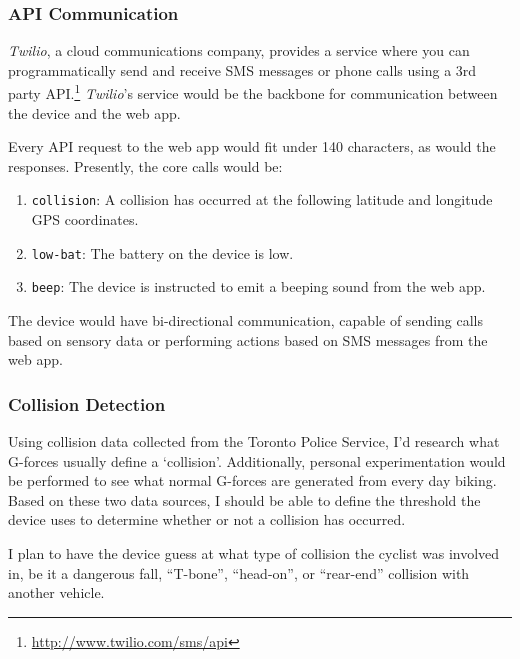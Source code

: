 \documentclass[titlepage]{article}
\begin{document}
\subsubsection{API Communication}
{\em Twilio}, a cloud communications company, provides a service where you can programmatically send and receive SMS messages or phone calls using a 3rd party API.\footnote{\url{http://www.twilio.com/sms/api}} {\em Twilio}'s service would be the backbone for communication between the device and the web app.

Every API request to the web app would fit under 140 characters, as would the responses. Presently, the core calls would be:

\begin{enumerate}
	\item {\tt collision}: A collision has occurred at the following latitude and longitude GPS coordinates.
	\item {\tt low-bat}: The battery on the device is low.
	\item {\tt beep}: The device is instructed to emit a beeping sound from the web app.
\end{enumerate}

The device would have bi-directional communication, capable of sending calls based on sensory data or performing actions based on SMS messages from the web app.

\subsubsection{Collision Detection}
Using collision data collected from the Toronto Police Service, I'd research what G-forces usually define a `collision'. Additionally, personal experimentation would be performed to see what normal G-forces are generated from every day biking. Based on these two data sources, I should be able to define the threshold the device uses to determine whether or not a collision has occurred.

I plan to have the device guess at what type of collision the cyclist was involved in, be it a dangerous fall, ``T-bone'', ``head-on'', or ``rear-end'' collision with another vehicle.
\end{document}
